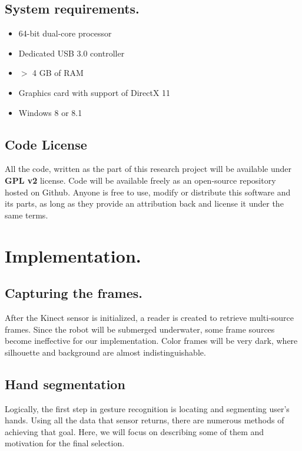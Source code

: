 \documentclass[a4paper,11pt,oneside]{article}
\begin{document}
\subsection{System requirements.}

  \begin{itemize}
  \item 64-bit dual-core processor
  \item Dedicated USB 3.0 controller
  \item $>$ 4 GB of RAM
  \item Graphics card with support of DirectX 11
  \item Windows 8 or 8.1
  \end{itemize}

  \subsection{Code License}
  
  All the code, written as the part of this research project will be available under \textbf{GPL v2} license. Code will be available freely as an open-source repository hosted on Github. Anyone is free to use, modify or distribute this software and its parts, as long as they provide an attribution back and license it under the same terms.

 \section{Implementation.}

\subsection{Capturing the frames.}

After the Kinect sensor is initialized, a reader is created to retrieve multi-source frames.  Since the robot will be submerged underwater, some frame sources become ineffective for our implementation. Color frames will be very dark, where silhouette and background are almost indistinguishable. 

  \subsection{Hand segmentation}
  
  Logically, the first step in gesture recognition is locating and segmenting user's hands. Using all the data that sensor returns, there are numerous methods of achieving that goal. Here, we will focus on describing some of them and motivation for the final selection.\\
  
\end{document}

